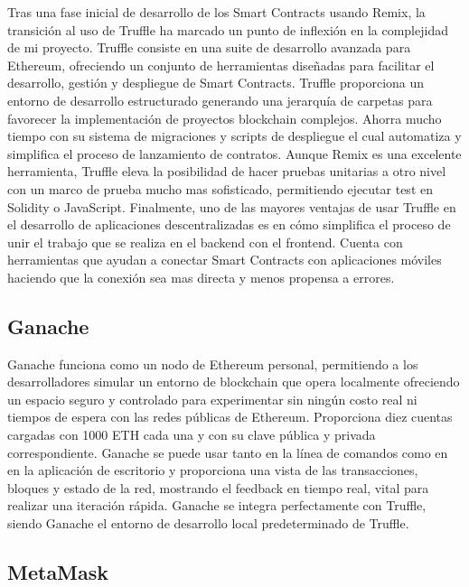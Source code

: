 Tras una fase inicial de desarrollo de los Smart Contracts usando Remix, la transición al uso de Truffle ha marcado un punto de inflexión en la complejidad de mi proyecto.
Truffle consiste en una suite de desarrollo avanzada para Ethereum, ofreciendo un conjunto de herramientas diseñadas para facilitar el desarrollo, gestión y despliegue de Smart Contracts.
Truffle proporciona un entorno de desarrollo estructurado generando una jerarquía de carpetas para favorecer la implementación de proyectos blockchain complejos.
Ahorra mucho tiempo con su sistema de migraciones y scripts de despliegue el cual automatiza y simplifica el proceso de lanzamiento de contratos.
Aunque Remix es una excelente herramienta, Truffle eleva la posibilidad de hacer pruebas unitarias a otro nivel con un marco de prueba mucho mas sofisticado, permitiendo ejecutar test en Solidity o JavaScript.
Finalmente, uno de las mayores ventajas de usar Truffle en el desarrollo de aplicaciones descentralizadas es en cómo simplifica el proceso de unir el trabajo que se realiza en el backend con el frontend. Cuenta con herramientas que ayudan a conectar Smart Contracts con aplicaciones móviles haciendo que la conexión sea mas directa y menos propensa a errores.


\subsection{Ganache}

Ganache funciona como un nodo de Ethereum personal, permitiendo a los desarrolladores simular un entorno de blockchain que opera localmente ofreciendo un espacio seguro y controlado para experimentar sin ningún costo real ni tiempos de espera con las redes públicas de Ethereum.
Proporciona diez cuentas cargadas con 1000 ETH cada una y con su clave pública y privada correspondiente.
Ganache se puede usar tanto en la línea de comandos como en en la aplicación de escritorio y proporciona  una vista de las transacciones, bloques y estado de la red, mostrando el feedback en tiempo real, vital para realizar una iteración rápida.
Ganache se integra perfectamente con Truffle, siendo Ganache el entorno de desarrollo local predeterminado de Truffle.


\subsection{MetaMask}

